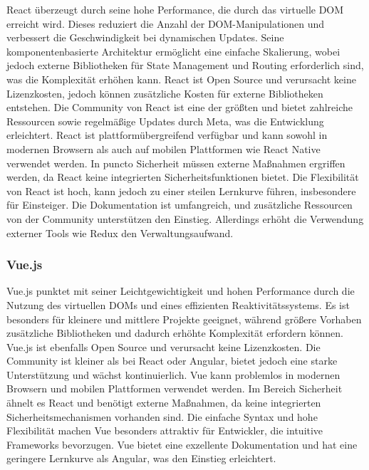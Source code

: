 React überzeugt durch seine hohe Performance, die durch das virtuelle DOM erreicht wird. Dieses reduziert die Anzahl der DOM-Manipulationen und verbessert die Geschwindigkeit bei dynamischen Updates. Seine komponentenbasierte Architektur ermöglicht eine einfache Skalierung, wobei jedoch externe Bibliotheken für State Management und Routing erforderlich sind, was die Komplexität erhöhen kann. React ist Open Source und verursacht keine Lizenzkosten, jedoch können zusätzliche Kosten für externe Bibliotheken entstehen. Die Community von React ist eine der größten und bietet zahlreiche Ressourcen sowie regelmäßige Updates durch Meta, was die Entwicklung erleichtert. React ist plattformübergreifend verfügbar und kann sowohl in modernen Browsern als auch auf mobilen Plattformen wie React Native verwendet werden. In puncto Sicherheit müssen externe Maßnahmen ergriffen werden, da React keine integrierten Sicherheitsfunktionen bietet. Die Flexibilität von React ist hoch, kann jedoch zu einer steilen Lernkurve führen, insbesondere für Einsteiger. Die Dokumentation ist umfangreich, und zusätzliche Ressourcen von der Community unterstützen den Einstieg. Allerdings erhöht die Verwendung externer Tools wie Redux den Verwaltungsaufwand. \textit{\cite{shetty2020review, rathinam2022analysis, hutagikar2020analysis, awasthiresearch}}

\subsubsection{Vue.js}

Vue.js punktet mit seiner Leichtgewichtigkeit und hohen Performance durch die Nutzung des virtuellen DOMs und eines effizienten Reaktivitätssystems. Es ist besonders für kleinere und mittlere Projekte geeignet, während größere Vorhaben zusätzliche Bibliotheken und dadurch erhöhte Komplexität erfordern können. Vue.js ist ebenfalls Open Source und verursacht keine Lizenzkosten. Die Community ist kleiner als bei React oder Angular, bietet jedoch eine starke Unterstützung und wächst kontinuierlich. Vue kann problemlos in modernen Browsern und mobilen Plattformen verwendet werden. Im Bereich Sicherheit ähnelt es React und benötigt externe Maßnahmen, da keine integrierten Sicherheitsmechanismen vorhanden sind. Die einfache Syntax und hohe Flexibilität machen Vue besonders attraktiv für Entwickler, die intuitive Frameworks bevorzugen. Vue bietet eine exzellente Dokumentation und hat eine geringere Lernkurve als Angular, was den Einstieg erleichtert. \textit{\cite{vue_blog, vuejs, rathinam2022analysis}}

